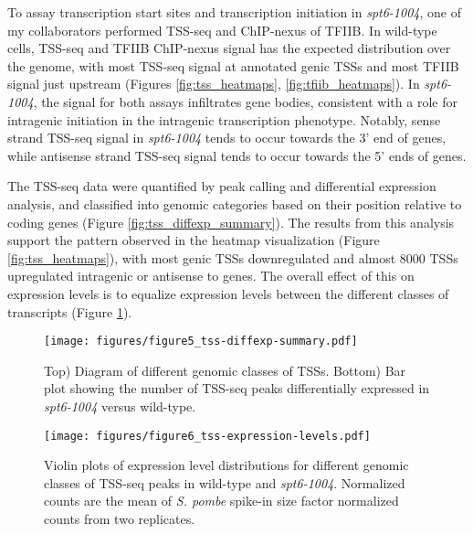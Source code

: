 \documentclass[9pt, letterpaper]{article}
\begin{document}
To assay transcription start sites and transcription initiation in \textit{spt6-1004}, one of my collaborators performed TSS-seq and ChIP-nexus of TFIIB. In wild-type cells, TSS-seq and TFIIB ChIP-nexus signal has the expected distribution over the genome, with most TSS-seq signal at annotated genic TSSs and most TFIIB signal just upstream (Figures \ref{fig:tss_heatmaps}, \ref{fig:tfiib_heatmaps}). In \textit{spt6-1004}, the signal for both assays infiltrates gene bodies, consistent with a role for intragenic initiation in the intragenic transcription phenotype. Notably, sense strand TSS-seq signal in \textit{spt6-1004} tends to occur towards the 3' end of genes, while antisense strand TSS-seq signal tends to occur towards the 5' ends of genes.

The TSS-seq data were quantified by peak calling and differential expression analysis, and classified into genomic categories based on their position relative to coding genes (Figure \ref{fig:tss_diffexp_summary}). The results from this analysis support the pattern observed in the heatmap visualization (Figure \ref{fig:tss_heatmaps}), with most genic TSSs downregulated and almost 8000 TSSs upregulated intragenic or antisense to genes. The overall effect of this on expression levels is to equalize expression levels between the different classes of transcripts (Figure \ref{fig:tss_expression_levels}).

\begin{figure}[H]
    \centering
    \begin{minipage}[t]{8.5cm}
        \centering
        \texttt{[image: figures/figure5\_tss-diffexp-summary.pdf]}
        \caption{Top) Diagram of different genomic classes of TSSs. Bottom) Bar plot showing the number of TSS-seq peaks differentially expressed in \textit{spt6-1004} versus wild-type.}
        \label{fig:tss_diffexp_summary}
    \end{minipage}\hfill
    \begin{minipage}[t]{8.5cm}
        \centering
        \texttt{[image: figures/figure6\_tss-expression-levels.pdf]}
        \caption{Violin plots of expression level distributions for different genomic classes of TSS-seq peaks in wild-type and \textit{spt6-1004}. Normalized counts are the mean of \textit{S. pombe} spike-in size factor normalized counts from two replicates.}
        \label{fig:tss_expression_levels}
    \end{minipage}
\end{figure}
\end{document}
